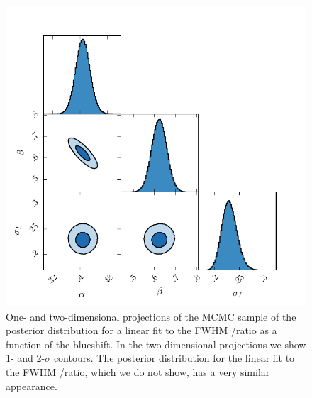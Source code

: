 \begin{figure}
    \includegraphics[width=\textwidth]{figures/chapter03/civ_ha_mcmc_parameters.pdf} 
    \caption{One- and two-dimensional projections of the MCMC sample of the posterior distribution for a linear fit to the FWHM /\ha ratio as a function of the  blueshift. In the two-dimensional projections we show 1- and 2-$\sigma$ contours. The posterior distribution for the linear fit to the FWHM /\hb ratio, which we do not show, has a very similar appearance.} 
    \label{fig:mcmc_parameters}
\end{figure}

